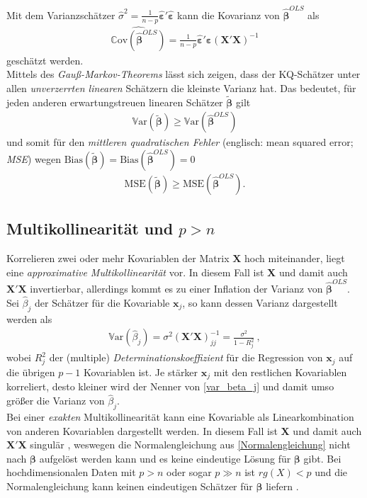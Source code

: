 \documentclass[12pt, a4paper]{report}\usepackage[]{graphicx}\usepackage[]{color}
\begin{document}
Mit dem Varianzschätzer $\hat{\sigma}^2=\frac{1}{n-p}\boldsymbol{\hat{\varepsilon}}'\boldsymbol{\hat{\varepsilon}}$ kann die Kovarianz von $\boldsymbol{\hat{\beta}}^{OLS}$ als
\begin{align}
\widehat{\mathbb{C}\text{ov}(\boldsymbol{\hat{\beta}}^{OLS})}=\frac{1}{n-p}\boldsymbol{\hat{\varepsilon}}'\boldsymbol{\hat{\varepsilon}}(\mathbf{X}'\mathbf{X})^{-1}
\end{align}
geschätzt werden.\\
Mittels des \textit{Gauß-Markov-Theorems} lässt sich zeigen, dass der KQ-Schätzer unter allen \textit{unverzerrten linearen} Schätzern die kleinste Varianz hat. Das bedeutet, für jeden anderen erwartungstreuen linearen Schätzer $\boldsymbol{\tilde{\beta}}$ gilt
\begin{align}
\mathbb{V}\text{ar}(\boldsymbol{\tilde{\beta}}) \ge \mathbb{V}\text{ar}(\boldsymbol{\hat{\beta}}^{OLS})
\end{align}
und somit für den\textit{ mittleren quadratischen Fehler} (englisch: mean squared error; \textit{MSE}) wegen $\text{Bias}(\boldsymbol{\tilde{\beta}})=\text{Bias}(\boldsymbol{\hat{\beta}}^{OLS})=0$
\begin{align}
\text{MSE}(\boldsymbol{\tilde{\beta}}) \ge \text{MSE}(\boldsymbol{\hat{\beta}}^{OLS}).
\end{align}

\subsection{Multikollinearität und $p > n$}\label{Kap_Multikollinearität und $p > n$}
Korrelieren zwei oder mehr Kovariablen der Matrix $\mathbf{X}$ hoch miteinander, liegt eine \textit{approximative Multikollinearität} vor. In diesem Fall ist $\mathbf{X}$ und damit auch $\mathbf{X}'\mathbf{X}$ invertierbar, allerdings kommt es zu einer Inflation der Varianz von $\boldsymbol{\hat{\beta}}^{OLS}$. Sei $\hat{\beta}_j$ der Schätzer für die Kovariable $\mathbf{x}_j$, so kann dessen Varianz dargestellt werden als
\begin{align}\label{var_beta_j}
\mathbb{V}\text{ar}(\hat{\beta}_j)=\sigma^2 (\mathbf{X}'\mathbf{X})^{-1}_{jj}=\frac{\sigma^2}{1-R^2_j} \ ,
\end{align}  
wobei $R^2_j$ der (multiple) \textit{Determinationskoeffizient} für die Regression von $\mathbf{x}_j$ auf die übrigen $p-1$ Kovariablen ist. Je stärker $\mathbf{x}_j$ mit den restlichen Kovariablen korreliert, desto kleiner wird der Nenner von \eqref{var_beta_j} und damit umso größer die Varianz von $\hat{\beta}_j$.\\
Bei einer \textit{exakten} Multikollinearität kann eine Kovariable als Linearkombination von anderen Kovariablen dargestellt werden. In diesem Fall ist $\mathbf{X}$ und damit auch $\mathbf{X}'\mathbf{X}$ singulär \cite{strang09ointro_linalg}, weswegen die Normalengleichung aus \eqref{Normalengleichung} nicht nach $\boldsymbol{\beta}$ aufgelöst werden kann und es keine eindeutige Lösung für $\boldsymbol{\beta}$ gibt. Bei hochdimensionalen Daten mit $p>n$ oder sogar $p \gg n$ ist $rg(X) < p$ und die Normalengleichung kann keinen eindeutigen Schätzer für $\boldsymbol{\beta}$ liefern \cite{johnstone_statistical_2009}.
\end{document}
